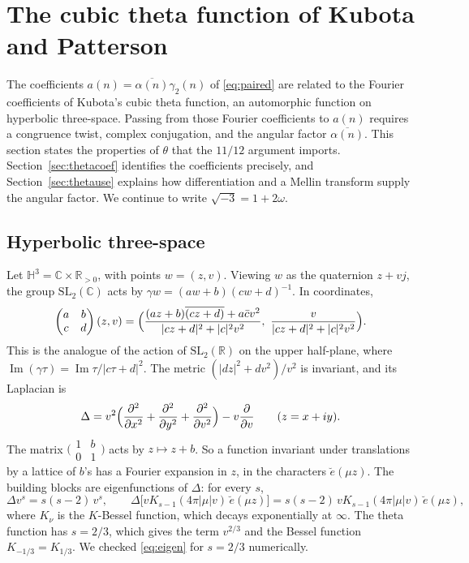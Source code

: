 \documentclass[11pt]{article}
\numberwithin{equation}{section}
\theoremstyle{definition}
\theoremstyle{remark}
\begin{document}
\section{The cubic theta function of Kubota and Patterson}\label{sec:theta}

The coefficients $a(n)=\overline{\alpha(n)}\gamma_2(n)$ of \eqref{eq:paired} are related to the Fourier
coefficients of Kubota's cubic theta function, an automorphic function on hyperbolic three-space.
Passing from those Fourier coefficients to $a(n)$ requires a congruence twist, complex conjugation,
and the angular factor $\overline{\alpha(n)}$. This section states the properties of $\theta$ that the
$11/12$ argument imports. Section~\ref{sec:thetacoef} identifies the coefficients precisely, and
Section~\ref{sec:thetause} explains how differentiation and a Mellin transform supply the angular factor.
We continue to write $\sqrt{-3}=1+2\omega$.

\subsection{Hyperbolic three-space}\label{sec:H3}
Let $\mathbb H^3=\mathbb C\times\mathbb R_{>0}$, with points $w=(z,v)$. Viewing $w$ as the quaternion $z+vj$, the group
$\mathrm{SL}_2(\mathbb C)$ acts by $\gamma w=(aw+b)(cw+d)^{-1}$. In coordinates,
\begin{equation}\label{eq:H3action}
 \begin{pmatrix}a&b\\c&d\end{pmatrix}(z,v)
 =\Bigl(\frac{(az+b)\overline{(cz+d)}+a\bar cv^2}{|cz+d|^2+|c|^2v^2},\ \frac v{|cz+d|^2+|c|^2v^2}\Bigr).
\end{equation}
This is the analogue of the action of $\mathrm{SL}_2(\mathbb R)$ on the upper half-plane, where
$\operatorname{Im}(\gamma\tau)=\operatorname{Im}\tau/|c\tau+d|^2$. The metric $(|dz|^2+dv^2)/v^2$ is invariant, and its Laplacian is
\begin{equation}\label{eq:laplacian}
 \Delta=v^2\Bigl(\frac{\partial^2}{\partial x^2}+\frac{\partial^2}{\partial y^2}+\frac{\partial^2}{\partial v^2}\Bigr)-v\frac\partial{\partial v}
 \qquad(z=x+iy).
\end{equation}
The matrix $\bigl(\begin{smallmatrix}1&b\\0&1\end{smallmatrix}\bigr)$ acts by $z\mapsto z+b$. So a function invariant under
translations by a lattice of $b$'s has a Fourier expansion in $z$, in the characters $\breve e(\mu z)$. The
building blocks are eigenfunctions of $\Delta$: for every $s$,
\begin{equation}\label{eq:eigen}
 \Delta v^s=s(s-2)\,v^s,\qquad
 \Delta\bigl[vK_{s-1}(4\pi|\mu|v)\,\breve e(\mu z)\bigr]=s(s-2)\,vK_{s-1}(4\pi|\mu|v)\,\breve e(\mu z),
\end{equation}
where $K_\nu$ is the $K$-Bessel function, which decays exponentially at $\infty$. The theta function has $s=2/3$,
which gives the term $v^{2/3}$ and the Bessel function $K_{-1/3}=K_{1/3}$. We checked \eqref{eq:eigen} for $s=2/3$
numerically.
\end{document}
